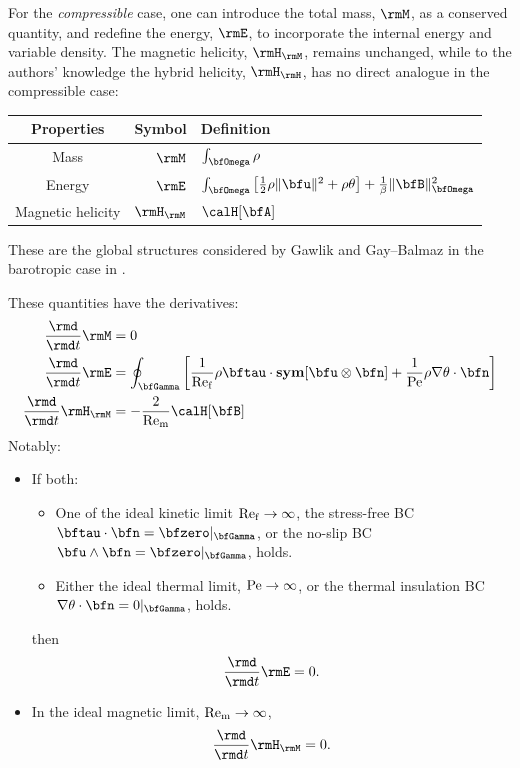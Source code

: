     For the \emph{compressible} case, one can introduce the total mass, $\rmM$, as a conserved quantity, and redefine the energy, $\rmE$, to incorporate the internal energy and variable density. The magnetic helicity, $\rmH_{\rmM}$, remains unchanged, while to the authors' knowledge the hybrid helicity, $\rmH_{\rmH}$, has no direct analogue in the compressible case:
    \begin{center}\begin{tabular}{ c | r : l }
        Properties  &  Symbol  &  Definition  \\
        \hline\hline
        Mass  &  $\rmM$  &  $\int_{\bfOmega}\rho$  \\
        Energy  &  $\rmE$  &  $\int_{\bfOmega}\left[\frac{1}{2}\rho\|\bfu\|^{2} + \rho\theta\right] + \frac{1}{\beta}\|\bfB\|_{\bfOmega}^{2}$  \\
        \hdashline
        Magnetic helicity \cite{Blackman_2015}  &  $\rmH_{\rmM}$  &  $\calH[\bfA]$
    \end{tabular}\end{center}
    These are the global structures considered by Gawlik and Gay--Balmaz in the barotropic case in \cite{Gawlik_Gay--Balmaz_2021}.

    These quantities have the derivatives:
    \begin{align}
        \frac{\rmd}{\rmd t}\rmM         &=  0  \\
        \frac{\rmd}{\rmd t}\rmE         &=  \oint_{\bfGamma}\left[\frac{1}{\rmRef}\rho\bftau\cdot\sym[\bfu\otimes\bfn] + \frac{1}{\rmPe}\rho\nabla\theta\cdot\bfn\right]  \\
        \frac{\rmd}{\rmd t}\rmH_{\rmM}  &=  - \frac{2}{\rmRem}\calH[\bfB]
    \end{align}
    Notably:
    \begin{itemize}
        \item  If both:
        \begin{itemize}
            \item  One of the ideal kinetic limit $\mathrm{Re}_{\mathrm{f}}  \rightarrow  \infty$, the stress-free BC $\bftau\cdot\bfn  =  \bfzero|_{\bfGamma}$, or the no-slip BC $\bfu\wedge\bfn  =  \bfzero|_{\bfGamma}$, holds.
            \item  Either the ideal thermal limit, $\mathrm{Pe}  \rightarrow  \infty$, or the thermal insulation BC $\nabla\theta\cdot\bfn  =  0|_{\bfGamma}$, holds.
        \end{itemize}
        then
        \begin{equation}
            \frac{\rmd}{\rmd t}\rmE  =  0.
        \end{equation}

        \item  In the ideal magnetic limit, $\mathrm{Re}_{\mathrm{m}}  \rightarrow  \infty$,
        \begin{equation}
            \frac{\rmd}{\rmd t}\rmH_{\rmM}  =  0.
        \end{equation}
      \end{itemize}

